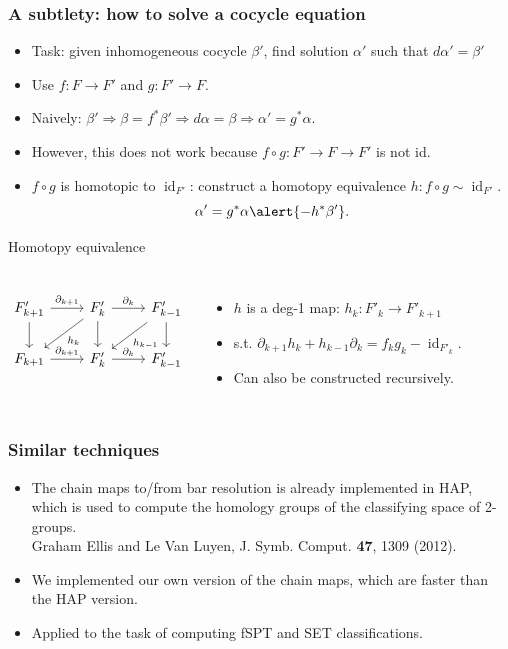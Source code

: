 \documentclass[xcolor=table, aspectratio=169]{beamer}
\DeclareMathOperator{\id}{id}
\begin{document}
\begin{frame}[fragile]
	\frametitle{A subtlety: how to solve a cocycle equation}
	\begin{itemize}
		\item Task: given inhomogeneous cocycle $\beta'$, find solution $\alpha'$ such that $d\alpha'=\beta'$
		\item Use $f:F\rightarrow F'$ and $g:F'\rightarrow F$.
		\item Naively: $\beta'\Rightarrow\beta = f^\ast\beta'\Rightarrow d\alpha = \beta\Rightarrow\alpha'=g^\ast\alpha$.
		\item However, this does not work because $f\circ g: F'\rightarrow F\rightarrow F'$ is not id.
		\item $f\circ g$ is homotopic to $\id_{F'}$: construct a homotopy equivalence $h: f\circ g\sim \id_{F'}$.
		\[\alpha' = g^\ast\alpha \alert{- h^\ast\beta'}.\]
	\end{itemize}
	\begin{block}{Homotopy equivalence}
		\begin{columns}
			\[\begin{tikzcd}
			    F'_{k+1}\arrow[r,"\partial_{k+1}"]\arrow[d]&
			    F'_k\arrow[r, "\partial_k"]
			    \arrow[d, ""]
			    \arrow[ld, "h_k"]&
			    F'_{k-1}\arrow[ld, "h_{k-1}"]\arrow[d]\\
			    F_{k+1}\arrow[r,"\partial_{k+1}"]&
			    F'_k\arrow[r, "\partial_k"]&
			    F'_{k-1}
			  \end{tikzcd}\]
			\begin{itemize}
				\item $h$ is a deg-1 map: $h_k:F'_k\rightarrow F'_{k+1}$
				\item s.t. $\partial_{k+1}h_k + h_{k-1}\partial_k
				=f_kg_k-\id_{F'_k}$.
				\item Can also be constructed recursively.
			\end{itemize}
		\end{columns}
	\end{block}
\end{frame}

\begin{frame}
	\frametitle{Similar techniques}
	\begin{itemize}
		\item The chain maps to/from bar resolution is already implemented in HAP, which is used to compute the homology groups of the classifying space of 2-groups.\\
		Graham Ellis and Le Van Luyen, J. Symb. Comput. \textbf{47}, 1309 (2012).
		\item We implemented our own version of the chain maps, which are faster than the HAP version.
		\item Applied to the task of computing fSPT and SET classifications.
	\end{itemize}
\end{frame}
\end{document}
